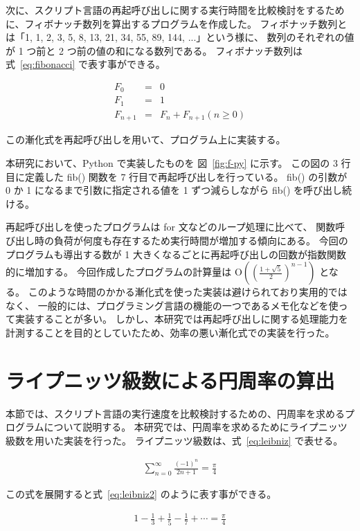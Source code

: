 次に、スクリプト言語の再起呼び出しに関する実行時間を比較検討をするために、フィボナッチ数列を算出するプログラムを作成した。
フィボナッチ数列とは「1, 1, 2, 3, 5, 8, 13, 21, 34, 55, 89, 144, ...」という様に、
数列のそれぞれの値が 1 つ前と 2 つ前の値の和になる数列である。
フィボナッチ数列は式~\ref{eq:fibonacci} で表す事ができる。

\begin{eqnarray}
\label{eq:fibonacci}
  F_{0}&=&0 \nonumber \\
  F_{1}&=&1 \\
  F_{n+1}&=&F_{n}+F_{n+1}(n≥0)\nonumber
\end{eqnarray}

この漸化式を再起呼び出しを用いて、プログラム上に実装する。

本研究において、Python で実装したものを 図~\ref{fig:f-py} に示す。
この図の 3 行目に定義した fib() 関数を 7 行目で再起呼び出しを行っている。
fib() の引数が 0 か 1 になるまで引数に指定される値を 1 ずつ減らしながら fib() を呼び出し続ける。

再起呼び出しを使ったプログラムは for 文などのループ処理に比べて、
関数呼び出し時の負荷が何度も存在するため実行時間が増加する傾向にある。
今回のプログラムも導出する数が 1 大きくなるごとに再起呼び出しの回数が指数関数的に増加する。
今回作成したプログラムの計算量は O$((\frac{1 +\sqrt{5}}{2})^{n-1})$ となる。
このような時間のかかる漸化式を使った実装は避けられており実用的ではなく、
一般的には、プログラミング言語の機能の一つであるメモ化などを使って実装することが多い。
しかし、本研究では再起呼び出しに関する処理能力を計測することを目的としていたため、効率の悪い漸化式での実装を行った。

\section{ライプニッツ級数による円周率の算出}
\label{cha:program:leibniz}

本節では、スクリプト言語の実行速度を比較検討するための、円周率を求めるプログラムについて説明する。
本研究では、円周率を求めるためにライプニッツ級数を用いた実装を行った。
ライプニッツ級数は、式~\ref{eq:leibniz} で表せる。

\begin{eqnarray} \label{eq:leibniz}
\sum_{n=0}^{\infty}\frac{(-1)^n}{2n+1}=\frac{\pi}{4}
\end{eqnarray}

この式を展開すると式~\ref{eq:leibniz2} のように表す事ができる。

\begin{eqnarray} \label{eq:leibniz2}
1-\frac{1}{3}+\frac{1}{5}-\frac{1}{7}+\cdots=\frac{\pi}{4}
\end{eqnarray}

